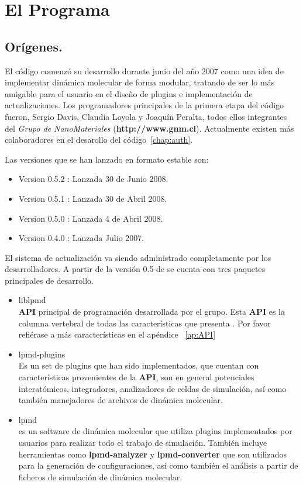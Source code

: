 \chapter{El Programa}
\label{chap:lpmd}

\section{Or\'igenes.}

El c\'odigo \lpmd comenz\'o su desarrollo durante junio del a\~no 2007 como una idea de implementar din\'amica molecular de forma modular, tratando de ser lo m\'as amigable para el usuario en el dise\~no de plugins e implementaci\'on de actualizaciones. Los programadores principales de la primera etapa del c\'odigo fueron, Sergio Davis, Claudia Loyola y Joaqu\'in Peralta, todos ellos integrantes del \textit{Grupo de NanoMateriales} (\textbf{http://www.gnm.cl}). Actualmente existen m\'as colaboradores en el desarollo del c\'odigo~\ref{chap:auth}.

Las versiones que se han lanzado en formato estable son:

\begin{itemize}
 \item Version 0.5.2 : Lanzada 30 de Junio 2008.
 \item Version 0.5.1 : Lanzada 30 de Abril 2008.
 \item Version 0.5.0 : Lanzada 4 de Abril 2008.
 \item Version 0.4.0 : Lanzada Julio 2007.
\end{itemize}

El sistema de actualizaci\'on va siendo administrado completamente por los desarrolladores. A partir de la versi\'on 0.5 de \lpmd se cuenta con tres paquetes principales de desarrollo.

\begin{itemize}
 \item liblpmd \\
\textbf{API} principal de programaci\'on desarrollada por el grupo. Esta \textbf{API} es la columna vertebral de todas las caracter\'isticas que presenta \lpmd. Por favor refi\'erase a m\'as caracter\'isticas en el ap\'endice ~\ref{ap:API}
 \item lpmd-plugins \\
Es un set de plugins que han sido implementados, que cuentan con caracter\'isticas provenientes de la \textbf{API}, son en general potenciales interat\'omicos, integradores, analizadores de celdas de simulaci\'on, as\'i como tambi\'en manejadores de archivos de din\'amica molecular.
 \item lpmd \\
\lpmd es un software de din\'amica molecular que utiliza plugins implementados por usuarios para realizar todo el trabajo de simulaci\'on. Tambi\'en incluye herramientas como \textbf{lpmd-analyzer} y \textbf{lpmd-converter} que son utilizados para la generaci\'on de configuraciones, as\'i como tambi\'en el an\'alisis a partir de ficheros de simulaci\'on de din\'amica molecular.
\end{itemize}

